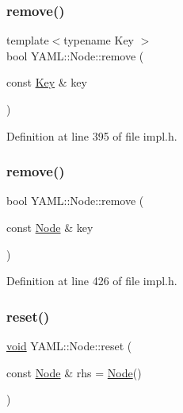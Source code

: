 \subsubsection{\texorpdfstring{remove()}{remove()}\hspace{0.1cm}{\footnotesize\ttfamily [1/2]}}
{\footnotesize\ttfamily template$<$typename Key $>$ \\
bool Y\+A\+M\+L\+::\+Node\+::remove (\begin{DoxyParamCaption}\item[{const \mbox{\hyperlink{namespace_y_a_m_l_a67c320aa50d3de7ecba1d0b8775dd684a1af533fc24b0311b8c4d5ac2870283aa}{Key}} \&}]{key }\end{DoxyParamCaption})\hspace{0.3cm}{\ttfamily [inline]}}



Definition at line 395 of file impl.\+h.

\mbox{\label{class_y_a_m_l_1_1_node_ab41bdfe9cb4071e2949f2d0aaeecd00e}} 
\subsubsection{\texorpdfstring{remove()}{remove()}\hspace{0.1cm}{\footnotesize\ttfamily [2/2]}}
{\footnotesize\ttfamily bool Y\+A\+M\+L\+::\+Node\+::remove (\begin{DoxyParamCaption}\item[{const \mbox{\hyperlink{class_y_a_m_l_1_1_node}{Node}} \&}]{key }\end{DoxyParamCaption})\hspace{0.3cm}{\ttfamily [inline]}}



Definition at line 426 of file impl.\+h.

\mbox{\label{class_y_a_m_l_1_1_node_ae9511d64500c0be6eeda5a9b969325ac}} 
\subsubsection{\texorpdfstring{reset()}{reset()}}
{\footnotesize\ttfamily \mbox{\hyperlink{glad_8h_a950fc91edb4504f62f1c577bf4727c29}{void}} Y\+A\+M\+L\+::\+Node\+::reset (\begin{DoxyParamCaption}\item[{const \mbox{\hyperlink{class_y_a_m_l_1_1_node}{Node}} \&}]{rhs = {\ttfamily \mbox{\hyperlink{class_y_a_m_l_1_1_node}{Node}}()} }\end{DoxyParamCaption})\hspace{0.3cm}{\ttfamily [inline]}}



